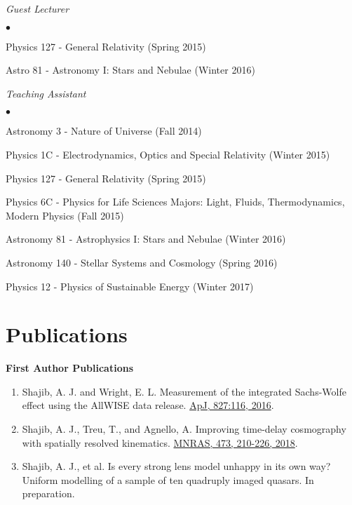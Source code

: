 \documentclass[margin,line]{res}
\newenvironment{list2}{
  \begin{list}{$\bullet$}{%
      \setlength{\itemsep}{0in}
      \setlength{\parsep}{0in} \setlength{\parskip}{0in}
      \setlength{\topsep}{0in} \setlength{\partopsep}{0in} 
      \setlength{\leftmargin}{0.2in}}}{\end{list}}
\begin{document}
\begin{resume}


{\em Guest Lecturer} \hfill {\bf}\\
\begin{list2}
	\item Physics 127 - General Relativity (Spring 2015)
	\item Astro 81 - Astronomy I: Stars and Nebulae (Winter 2016)
\end{list2}
	
{\em Teaching Assistant} \hfill {}\\
\begin{list2}
	\item Astronomy 3 - Nature of Universe (Fall 2014)
	\item Physics 1C - Electrodynamics, Optics and Special Relativity (Winter 2015)
	\item Physics 127 - General Relativity (Spring 2015)
	\item Physics 6C - Physics for Life Sciences Majors: Light, Fluids, Thermodynamics, Modern Physics (Fall 2015)
	\item Astronomy 81 - Astrophysics I: Stars and Nebulae (Winter 2016)
	\item Astronomy 140 - Stellar Systems and Cosmology (Spring 2016)
	\item Physics 12 - Physics of Sustainable Energy (Winter 2017)
\end{list2}



\section{\sc Publications}
\textbf{First Author Publications} \\
\begin{enumerate}
	\item {Shajib, A. J.} and Wright, E. L. Measurement of the integrated Sachs-Wolfe effect using the AllWISE data release. \href{http://dx.doi.org/10.3847/0004-637X/827/2/116}{ApJ, 827:116, 2016}.
	\item {Shajib, A. J.}, Treu, T., and Agnello, A. Improving time-delay cosmography with spatially resolved kinematics. \href{https://doi.org/10.1093/mnras/stx2302}{MNRAS, 473, 210-226, 2018}.
	\item {Shajib, A. J.}, et al. Is every strong lens model unhappy in its own way? Uniform modelling of a sample of ten quadruply imaged quasars. In preparation.
\end{enumerate}


\end{resume}
\end{document}
